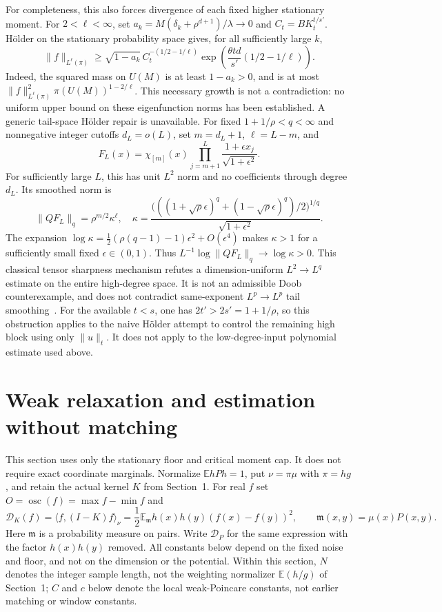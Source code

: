\documentclass[11pt]{article}
\newcommand{\E}{\mathbb E}
\begin{document}
For completeness, this also forces divergence of each fixed higher
stationary moment. For $2<\ell<\infty$, set
$a_k=M(\delta_k+\rho^{d+1})/\lambda\to0$ and
$C_t=BK_t^{t/s'}$. H\"older on the stationary probability space gives,
for all sufficiently large $k$,
\[
 \|f\|_{L^\ell(\pi)}\ge
 \sqrt{1-a_k}\,C_t^{-(1/2-1/\ell)}
 \exp\!\left(\frac{\theta td}{s'}(1/2-1/\ell)\right).
\]
Indeed, the squared mass on $U(M)$ is at least $1-a_k>0$, and is at
most $\|f\|_{L^\ell(\pi)}^2\pi(U(M))^{1-2/\ell}$.
This necessary growth is not a contradiction: no uniform upper bound
on these eigenfunction norms has been established.
A generic tail-space H\"older repair is unavailable. For fixed
$1+1/\rho<q<\infty$ and nonnegative integer cutoffs $d_L=o(L)$, set $m=d_L+1$, $\ell=L-m$, and
\[
 F_L(x)=\chi_{[m]}(x)\prod_{j=m+1}^{L}
       \frac{1+\epsilon x_j}{\sqrt{1+\epsilon^2}}.
\]
For sufficiently large $L$, this has unit $L^2$ norm and no coefficients
through degree $d_L$. Its smoothed norm is
\[
 \|QF_L\|_q=\rho^{m/2}\kappa^\ell,\quad
 \kappa=\frac{\bigl(((1+\sqrt\rho\epsilon)^q+
 (1-\sqrt\rho\epsilon)^q)/2\bigr)^{1/q}}{\sqrt{1+\epsilon^2}}.
\]
The expansion $\log\kappa=\tfrac12(\rho(q-1)-1)\epsilon^2+
O(\epsilon^4)$ makes $\kappa>1$ for a sufficiently small fixed
$\epsilon\in(0,1)$. Thus $L^{-1}\log\|QF_L\|_q\to\log\kappa>0$.
This classical tensor sharpness mechanism refutes a dimension-uniform
$L^2\to L^q$ estimate on the entire high-degree space. It is not an
admissible Doob counterexample, and does not contradict same-exponent
$L^p\to L^p$ tail smoothing~\cite{hmo,volberg}. For the available $t<s$, one has $2t'>2s'=1+1/\rho$, so this obstruction applies to the naive H\"older attempt to control the remaining high block using only $\|u\|_t$. It does not apply to the low-degree-input polynomial estimate used above.


\section{Weak relaxation and estimation without matching}\label{weakrelaxation}
This section uses only the stationary floor and critical moment cap.
It does not require exact coordinate marginals. Normalize $\E hPh=1$,
put $\nu=\pi\mu$ with $\pi=hg$, and retain the actual kernel $K$ from
Section~1. For real $f$ set $O=\operatorname{osc}(f)=\max f-\min f$ and
\[
 \mathcal D_K(f)=\langle f,(I-K)f\rangle_\nu
 =\frac12\E_{\mathfrak m}
       h(x)h(y)(f(x)-f(y))^2,\qquad
 \mathfrak m(x,y)=\mu(x)P(x,y).
\]
Here $\mathfrak m$ is a probability measure on pairs. Write $\mathcal D_P$
for the same expression with the factor $h(x)h(y)$ removed. All constants
below depend on the fixed noise and floor, and not on the dimension or
the potential.
Within this section, $N$ denotes the integer sample length, not the
weighting normalizer $\E(h/g)$ of Section~1; $C$ and $c$ below denote
the local weak-Poincare constants, not earlier matching or window constants.
\end{document}
